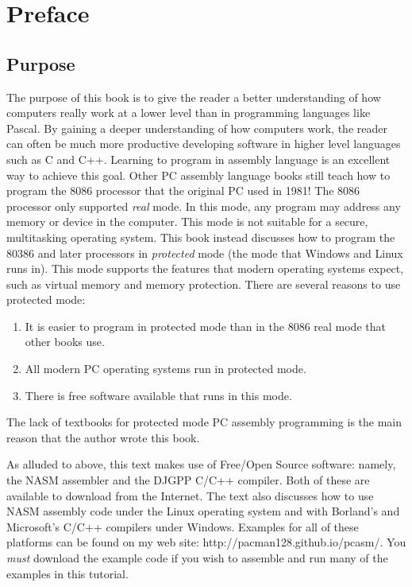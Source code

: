 
\chapter{Preface}

\section*{Purpose}

The purpose of this book is to give the reader a better understanding
of how computers really work at a lower level than in programming
languages like Pascal. By gaining a deeper understanding of how
computers work, the reader can often be much more productive
developing software in higher level languages such as C and
C++. Learning to program in assembly language is an excellent way to
achieve this goal. Other PC assembly language books still teach how to
program the 8086 processor that the original PC used in 1981!  The
8086 processor only supported \emph{real} mode. In this mode, any
program may address any memory or device in the computer. This mode is
not suitable for a secure, multitasking operating system.  This book
instead discusses how to program the 80386 and later processors in
\emph{protected} mode (the mode that Windows and Linux runs in).
This mode supports the features that modern operating systems expect,
such as virtual memory and memory protection.
There are several reasons to use protected mode:
\begin{enumerate}
\item It is easier to program in protected mode than in the 8086 real mode
      that other books use.
\item All modern PC operating systems run in protected mode.
\item There is free software available that runs in this mode.
\end{enumerate}
The lack of textbooks for protected mode PC assembly programming is the
main reason that the author wrote this book.

As alluded to above, this text makes use of Free/Open Source software: namely,
the NASM assembler and the DJGPP C/C++ compiler. Both of these are available
to download from the Internet. The text also discusses how to use NASM 
assembly code under the Linux operating system and with Borland's and
Microsoft's C/C++ compilers under Windows. Examples for all of these
platforms can be found on my web site: 
{\code http://pacman128.github.io/pcasm/}.
You \emph{must} download the example code if you wish to assemble
and run many of the examples in this tutorial.

